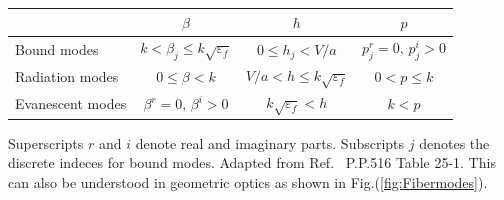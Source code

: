 \documentclass[]{report}
\begin{document}
\begin{minipage}{0.97\textwidth}
\centering
{} \label{tab:fiberparameters} 
\begin{tabular}{|l|c|c|c|}
\hline  & $\beta$ & $h$ & $p$ \\ 
\hline Bound modes & $k<\beta_j \leq k\sqrt{\varepsilon_f} $ & $ 0\leq h_j<V/a $ & $ p^r_j=0,\, p^i_j>0 $ \\ 
\hline Radiation modes & $0\leq \beta<k$ & $V/a < h\leq k\sqrt{\varepsilon_f}$ & $0<p\leq k $\\ 
\hline Evanescent modes & $ \beta^r=0,\, \beta^i>0 $ & $ k\sqrt{\varepsilon_f} < h $ & $ k<p $ \\ 
\hline 
\end{tabular} 
\par
\bigskip
Superscripts $ r $ and $ i $ denote real and imaginary parts. Subscripts $ j $ denotes the discrete indeces for bound modes. Adapted from Ref.~\cite{Snyder1983} P.P.516 Table 25-1. This can also be understood in geometric optics as shown in Fig.(\ref{fig:Fibermodes}).
\end{minipage}
\bigskip
\end{document}
